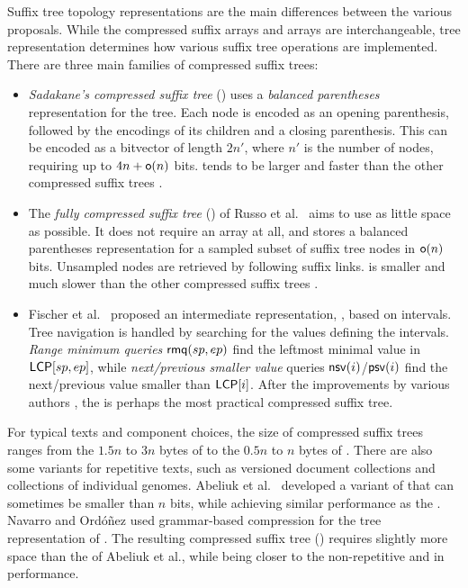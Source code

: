 Suffix tree topology representations are the main differences between the
various \CST{} proposals. While the compressed suffix arrays and \LCP{} arrays
are interchangeable, tree representation determines how various suffix tree
operations are implemented. There are three main families of compressed suffix
trees:
\begin{itemize}
\item \emph{Sadakane's compressed suffix tree} (\CSTsada) \cite{Sadakane2007}
uses a \emph{balanced parentheses} representation for the tree. Each node is
encoded as an opening parenthesis, followed by the encodings of its children
and a closing parenthesis. This can be encoded as a bitvector of length $2n'$,
where $n'$ is the number of nodes, requiring up to $4n+\mathsf{o}(n)$ bits.
\CSTsada{} tends to be larger and faster than the other compressed suffix
trees \cite{Gog2011a,Abeliuk2013}.
\item The \emph{fully compressed suffix tree} (\FCST) of Russo et
al.~\cite{Russo2011,Navarro2014a} aims to use as little space as possible. It
does not require an \LCP{} array at all, and stores a balanced parentheses
representation for a sampled subset of suffix tree nodes in $\mathsf{o}(n)$ bits.
Unsampled nodes are retrieved by following suffix links. \FCST{} is smaller
and much slower than the other compressed suffix trees
\cite{Russo2011,Abeliuk2013}.
\item Fischer et al.~\cite{Fischer2009a} proposed an intermediate
representation, \CSTnpr, based on \LCP{} intervals. Tree navigation is handled
by searching for the values defining the \LCP{} intervals. \emph{Range minimum
queries} $\mathsf{rmq}(sp,ep)$ find the leftmost minimal value in $\mathsf{LCP}[sp,ep]$,
while \emph{next/previous smaller value} queries $\mathsf{nsv}(i)$/$\mathsf{psv}(i)$ find
the next/previous \LCP{} value smaller than $\mathsf{LCP}[i]$. After the improvements
by various authors \cite{Ohlebusch2009,Ohlebusch2010,Gog2011a,Abeliuk2013},
the \CSTnpr{} is perhaps the most practical compressed suffix tree.
\end{itemize}

For typical texts and component choices, the size of compressed suffix trees
ranges from the $1.5n$ to $3n$ bytes of \CSTsada{} to the $0.5n$ to $n$ bytes
of \FCST{} \cite{Gog2011a,Abeliuk2013}. There are also some \CST{} variants
for repetitive texts, such as versioned document collections and collections
of individual genomes. Abeliuk et al.~\cite{Abeliuk2013} developed a variant
of \CSTnpr{} that can sometimes be smaller than $n$ bits, while achieving
similar performance as the \FCST. Navarro and Ordóñez \cite{Navarro2014} used
grammar-based compression for the tree representation of \CSTsada. The
resulting compressed suffix tree (\GCT) requires slightly more space than the
\CSTnpr{} of Abeliuk et al., while being closer to the non-repetitive
\CSTsada{} and \CSTnpr{} in performance.

